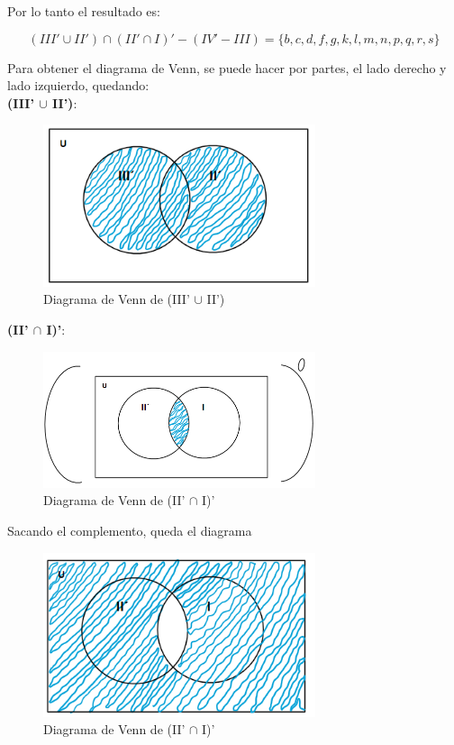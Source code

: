 Por lo tanto el resultado es:

\begin{equation*}
    \boxed{(III' \cup II') \cap (II' \cap I)' - (IV' - III)  =  \{  b, c, d, f, g, k, l, m, n, p, q, r, s      \}    }
\end{equation*}


\newpage


Para obtener el diagrama de Venn, se puede hacer por partes, el lado derecho y lado izquierdo, quedando: \\


\textbf{(III' $\cup$ II')}: 

\begin{figure}[htbp]
\centering
\includegraphics[width=8cm]{f/aa.png}
\caption[]{Diagrama de Venn de (III' $\cup$ II')}
\end{figure} 


\textbf{(II' $\cap$ I)'}:

\begin{figure}[htbp]
\centering
\includegraphics[width=8cm]{f/bb.png}
\caption[]{Diagrama de Venn de (II' $\cap$ I)'}
\end{figure} 

Sacando el complemento, queda el diagrama

\begin{figure}[htbp]
\centering
\includegraphics[width=8cm]{f/bbb.png}
\caption[]{Diagrama de Venn de (II' $\cap$ I)'}
\end{figure} 

